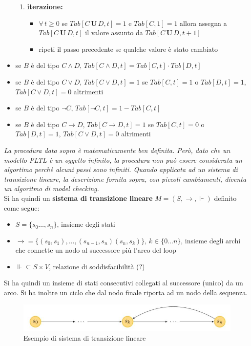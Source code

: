 \documentclass[a4paper,12pt, oneside]{book}
\begin{document}
\begin{itemize}
\begin{enumerate}
    \item \textbf{iterazione:}
    \begin{itemize}
      \item $\forall\,t\geq 0$ se $Tab[C\,\mathbf{U}\,D, t] = 1$ e
      $Tab[C,1]=1$ allora assegna a $Tab[C\,\mathbf{U}\,D, t]$ il valore
      assunto da $Tab[C\,\mathbf{U}\,D, t+1]$ 
      \item ripeti il passo precedente se qualche valore è stato cambiato
    \end{itemize}
  \end{enumerate}
  \item se $B$ è del tipo $C \land D$, $Tab[C \land D, t] = Tab[C, t] \cdot
  Tab[D, t]$  
  \item se $B$ è del tipo $C \lor D$, $Tab[C \lor D, t] = 1$ se $Tab[C, t] = 1$ o
  $Tab[D, t] = 1$, $Tab[C \lor D, t] = 0$ altrimenti
  \item se $B$ è del tipo $\neg C$, $Tab[\neg C, t] = 1 − Tab[C, t]$
  \item se $B$ è del tipo $C \to D$, $Tab[C \to D, t] = 1$ se $Tab[C, t] = 0$ o
  $Tab[D, t] = 1$, $Tab[C \lor D, t] = 0$ altrimenti
\end{itemize}
\textit{La procedura data sopra è matematicamente ben definita. Però, dato che
  un modello PLTL è un oggetto infinito, la procedura non può essere considerata
  un algortimo perchè alcuni passi sono infiniti. Quando applicata ad un sistema
  di transizione lineare, la descrizione fornita sopra, con piccoli cambiamenti,
  diventa un algoritmo di model checking.}\\
Si ha quindi un \textbf{sistema di transizione lineare} $M=(S,\to,\Vdash)$
definito come segue:
\begin{itemize}
  \item $S=\{s_0\ldots,s_n\}$, insieme degli stati
  \item $\to=\{(s_0,s_1),\ldots,(s_{n-1},s_n)(s_n,s_k)\},\,k\in\{0\ldots n\}$,
  insieme degli archi che connette un nodo al successore più l'arco del loop
  \item $\Vdash\subseteq S\times V$, relazione di soddisfacibilità (?)
\end{itemize}
Si ha quindi un insieme di stati consecutivi collegati al successore (unico) da
un arco. Si ha inoltre un ciclo che dal nodo finale riporta ad un nodo della
sequenza.
\begin{figure}[H]
  \centering
  \includegraphics[scale = 0.5]{img/sro2.jpg}
  \caption{Esempio di sistema di transizione lineare} 
\end{figure}
\end{document}
